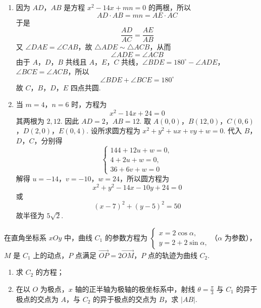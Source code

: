 \begin{solution}
\begin{enumerate}
\item 因为 \(AD\)，\(AB\) 是方程 \(x^{2}-14x+mn=0\) 的两根，所以
\[
AD\cdot AB=mn=AE\cdot AC
\]
于是
\[
\frac{AD}{AC}=\frac{AE}{AB}
\]
又 \(\angle DAE=\angle CAB\)，故 \(\triangle ADE\sim\triangle ACB\)，从而
\[
\angle ADE=\angle ACB
\]
由于 \(A\)，\(D\)，\(B\) 共线且 \(A\)，\(E\)，\(C\) 共线，\(\angle BDE=180^\circ-\angle ADE\)，\(\angle BCE=\angle ACB\)，所以
\[
\angle BDE+\angle BCE=180^\circ
\]
故 \(C\)，\(B\)，\(D\)，\(E\) 四点共圆.
\item 当 \(m=4\)，\(n=6\) 时，方程为
\[
x^{2}-14x+24=0
\]
其两根为 \(2,12\). 因此 \(AD=2\)，\(AB=12\). 取 \(A(0,0)\)，\(B(12,0)\)，\(C(0,6)\)，\(D(2,0)\)，\(E(0,4)\).
设所求圆方程为 \(x^{2}+y^{2}+ux+vy+w=0\). 代入 \(B\)，\(D\)，\(C\)，分别得
\[
\begin{cases}
144+12u+w=0,\\
4+2u+w=0,\\
36+6v+w=0
\end{cases}
\]
解得 \(u=-14\)，\(v=-10\)，\(w=24\)，所以圆方程为
\[
x^{2}+y^{2}-14x-10y+24=0
\]
或
\[
(x-7)^{2}+(y-5)^{2}=50
\]
故半径为 \(5\sqrt2\).
\end{enumerate}
\end{solution}

\begin{problem}
在直角坐标系 \(xOy\) 中，曲线 \(C_1\) 的参数方程为 \(\begin{cases}
x = 2\cos \alpha,\\
y = 2 + 2\sin \alpha,
\end{cases}\)（\(\alpha\) 为参数），\(M\) 是 \(C_1\) 上的动点，\(P\) 点满足 \(\overrightarrow{OP} = 2\overrightarrow{OM}\)，\(P\) 点的轨迹为曲线 \(C_2\).
\begin{enumerate}
\item 求 \(C_2\) 的方程；
\item 在以 \(O\) 为极点，\(x\) 轴的正半轴为极轴的极坐标系中，射线 \(\theta = \frac{\pi}{3}\) 与 \(C_1\) 的异于极点的交点为 \(A\)，与 \(C_2\) 的异于极点的交点为 \(B\)，求 \(|AB|\).
\end{enumerate}
\end{problem}


